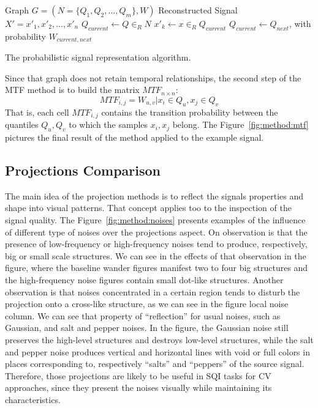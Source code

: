 \begin{algorithm}
    \begin{algorithmic}
        \Require Graph $G=(N=\{Q_1, Q_2, ..., Q_m\},W)$
        \Ensure Reconstructed Signal $X'=x'_1,x'_2,...,x'_n$
        \State $Q_{current} \gets Q \in_R N$ 
            \State $x'_k \gets x \in_R Q_{current}$
            \State $Q_{current} \gets Q_{next}$, with probability $W_{current,next}$
        \EndFor
    \end{algorithmic}
    \caption{The probabilistic signal representation algorithm. }
    \label{alg:mtf_reconstruction}
\end{algorithm}

Since that graph does not retain temporal relationships, the second step of the \gls{MTF} method is to build the matrix $MTF_{n \times n}$:
\begin{equation}
    MTF_{i,j} = W_{u,v} | x_i \in Q_u, x_j \in Q_v
\end{equation}
\noindent That is, each cell $MTF_{i,j}$ contains the transition probability between the quantiles $Q_u,Q_v$ to which the samples $x_i,x_j$ belong. The Figure~\ref{fig:method:mtf} pictures the final result of the method applied to the example signal. 



\subsection{Projections Comparison}

The main idea of the projection methods is to reflect the signals properties and shape into visual patterns. That concept applies too to the inspection of the signal quality. The Figure~\ref{fig:method:noises} presents examples of the influence of different type of noises over the projections aspect. On observation is that the presence of low-frequency or high-frequency noises tend to produce, respectively, big or small scale structures. We can see in the effects of that observation in the figure, where the baseline wander figures manifest two to four big structures and the high-frequency noise figures contain small dot-like structures. Another observation is that noises concentrated in a certain region tends to disturb the projection onto a cross-like structure, as we can see in the figure local noise column. We can see that property of ``reflection'' for usual noises, such as Gaussian, and salt and pepper noises. In the figure, the Gaussian noise still preserves the high-level structures and destroys low-level structures, while the salt and pepper noise produces vertical and horizontal lines with void or full colors in places corresponding to, respectively ``salts'' and ``peppers'' of the source signal. Therefore, those projections are likely to be useful in \gls{SQI} tasks for \gls{CV} approaches, since they present the noises visually while maintaining its characteristics.  

